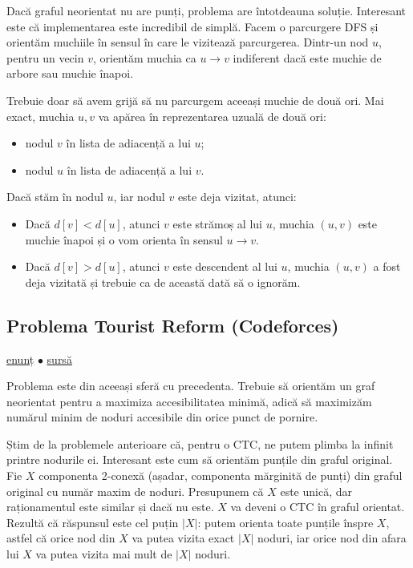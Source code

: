 \documentclass[../main.tex]{subfiles}
\begin{document}
Dacă graful neorientat nu are punți, problema are întotdeauna soluție. Interesant este că implementarea este incredibil de simplă. Facem o parcurgere DFS și orientăm muchiile în sensul în care le vizitează parcurgerea. Dintr-un nod $u$, pentru un vecin $v$, orientăm muchia ca $u \to v$ indiferent dacă este muchie de arbore sau muchie înapoi.

Trebuie doar să avem grijă să nu parcurgem aceeași muchie de două ori. Mai exact, muchia $u,v$ va apărea în reprezentarea uzuală de două ori:

\begin{itemize}
  \item nodul $v$ în lista de adiacență a lui $u$;
  \item nodul $u$ în lista de adiacență a lui $v$.
\end{itemize}

Dacă stăm în nodul $u$, iar nodul $v$ este deja vizitat, atunci:

\begin{itemize}
  \item Dacă $d[v] < d[u]$, atunci $v$ este strămoș al lui $u$, muchia $(u,v)$ este muchie înapoi și o vom orienta în sensul $u \to v$.

  \item Dacă $d[v] > d[u]$, atunci $v$ este descendent al lui $u$, muchia $(u,v)$ a fost deja vizitată și trebuie ca de această dată să o ignorăm.
\end{itemize}

\subsection{Problema Tourist Reform (Codeforces)}
\label{problem:tourist-reform}

\href{https://codeforces.com/contest/732/problem/F}{enunț}
$\bullet$
\hyperref[code:tourist-reform]{sursă}

Problema este din aceeași sferă cu precedenta. Trebuie să orientăm un graf neorientat pentru a maximiza accesibilitatea minimă, adică să maximizăm numărul minim de noduri accesibile din orice punct de pornire.

Știm de la problemele anterioare că, pentru o CTC, ne putem plimba la infinit printre nodurile ei. Interesant este cum să orientăm punțile din graful original. Fie $X$ componenta 2-conexă (așadar, componenta mărginită de punți) din graful original cu număr maxim de noduri. Presupunem că $X$ este unică, dar raționamentul este similar și dacă nu este. $X$ va deveni o CTC în graful orientat. Rezultă că răspunsul este cel puțin $|X|$: putem orienta toate punțile înspre $X$, astfel că orice nod din $X$ va putea vizita exact $|X|$ noduri, iar orice nod din afara lui $X$ va putea vizita mai mult de $|X|$ noduri.
\end{document}
